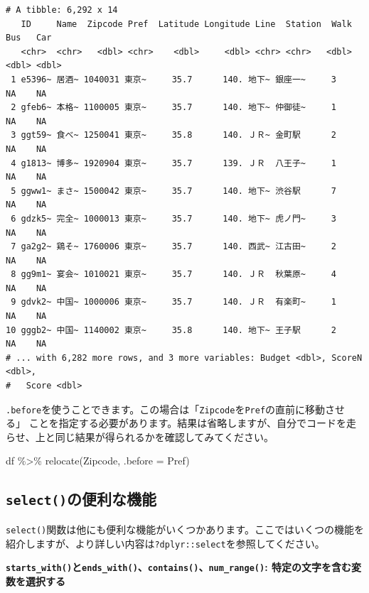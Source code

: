 \documentclass[
  a4paper,
  pandoc,
  ja=standard,
  jafont=haranoaji]{bxjsbook}
\newenvironment{Shaded}{\begin{snugshade}}{\end{snugshade}}
\newcommand{\AttributeTok}[1]{\textcolor[rgb]{0.00,0.48,0.65}{#1}}
\newcommand{\FunctionTok}[1]{\textcolor[rgb]{0.28,0.35,0.67}{#1}}
\newcommand{\NormalTok}[1]{\textcolor[rgb]{0.00,0.48,0.65}{#1}}
\newcommand{\SpecialCharTok}[1]{\textcolor[rgb]{0.37,0.37,0.37}{#1}}
\begin{document}
\begin{verbatim}
# A tibble: 6,292 x 14
   ID     Name  Zipcode Pref  Latitude Longitude Line  Station  Walk   Bus   Car
   <chr>  <chr>   <dbl> <chr>    <dbl>     <dbl> <chr> <chr>   <dbl> <dbl> <dbl>
 1 e5396~ 居酒~ 1040031 東京~     35.7      140. 地下~ 銀座一~     3    NA    NA
 2 gfeb6~ 本格~ 1100005 東京~     35.7      140. 地下~ 仲御徒~     1    NA    NA
 3 ggt59~ 食べ~ 1250041 東京~     35.8      140. ＪＲ~ 金町駅      2    NA    NA
 4 g1813~ 博多~ 1920904 東京~     35.7      139. ＪＲ  八王子~     1    NA    NA
 5 ggww1~ まさ~ 1500042 東京~     35.7      140. 地下~ 渋谷駅      7    NA    NA
 6 gdzk5~ 完全~ 1000013 東京~     35.7      140. 地下~ 虎ノ門~     3    NA    NA
 7 ga2g2~ 鶏そ~ 1760006 東京~     35.7      140. 西武~ 江古田~     2    NA    NA
 8 gg9m1~ 宴会~ 1010021 東京~     35.7      140. ＪＲ  秋葉原~     4    NA    NA
 9 gdvk2~ 中国~ 1000006 東京~     35.7      140. ＪＲ  有楽町~     1    NA    NA
10 gggb2~ 中国~ 1140002 東京~     35.8      140. 地下~ 王子駅      2    NA    NA
# ... with 6,282 more rows, and 3 more variables: Budget <dbl>, ScoreN <dbl>,
#   Score <dbl>
\end{verbatim}

\texttt{.before}を使うことできます。この場合は「\texttt{Zipcode}を\texttt{Pref}の直前に移動させる」
ことを指定する必要があります。結果は省略しますが、自分でコードを走らせ、上と同じ結果が得られるかを確認してみてください。

\begin{Shaded}
\begin{Highlighting}[numbers=left,,]
\NormalTok{df }\SpecialCharTok{\%\textgreater{}\%}
  \FunctionTok{relocate}\NormalTok{(Zipcode, }\AttributeTok{.before =}\NormalTok{ Pref)}
\end{Highlighting}
\end{Shaded}

\hypertarget{selectux306eux4fbfux5229ux306aux6a5fux80fd}{%
\subsection{\texorpdfstring{\texttt{select()}の便利な機能}{select()の便利な機能}}\label{selectux306eux4fbfux5229ux306aux6a5fux80fd}}

\texttt{select()}関数は他にも便利な機能がいくつかあります。ここではいくつの機能を紹介しますが、より詳しい内容は\texttt{?dplyr::select}を参照してください。

\textbf{\texttt{starts\_with()}と\texttt{ends\_with()}、\texttt{contains()}、\texttt{num\_range()}:
特定の文字を含む変数を選択する}
\end{document}
